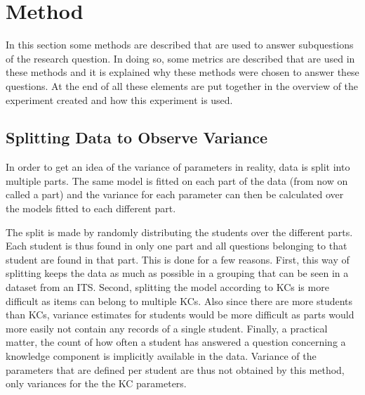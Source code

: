 \documentclass{scrartcl}
\begin{document}
\section{Method}

In this section some methods are described that are used to answer subquestions of the research question. In doing so, some metrics are described that are used in these methods and it is explained why these methods were chosen to answer these questions. At the end of all these elements are put together in the overview of the experiment created and how this experiment is used.

\subsection{Splitting Data to Observe Variance}
\label{sec:splits}
In order to get an idea of the variance of parameters in reality, data is split into multiple parts. The same model is fitted on each part of the data (from now on called a part) and the variance for each parameter can then be calculated over the models fitted to each different part. 

The split is made by randomly distributing the students over the different parts. Each student is thus found in only one part and all questions belonging to that student are found in that part. This is done for a few reasons. First, this way of splitting keeps the data as much as possible in a grouping that can be seen in a dataset from an ITS.  Second, splitting the model according to KCs is more difficult as items can belong to multiple KCs. Also since there are more students than KCs, variance estimates for students would be more difficult as parts would more easily not contain any records of a single student. Finally, a practical matter, the count of how often a student has answered a question concerning a knowledge component is implicitly available in the data. Variance of the parameters that are defined per student are thus not obtained by this method, only variances for the the KC parameters.
\end{document}
